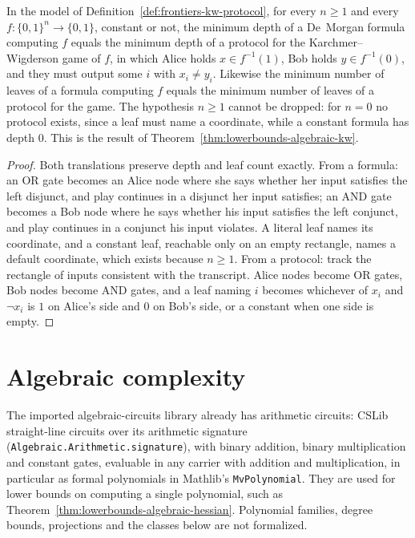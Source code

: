 \begin{theorem}
  \label{thm:frontiers-kw-general}
  \leanok
  In the model of Definition~\ref{def:frontiers-kw-protocol}, for every
  $n \ge 1$ and every $f : \{0,1\}^n \to \{0,1\}$, constant or not, the minimum
  depth of a De~Morgan formula computing $f$ equals the minimum depth of a
  protocol for the Karchmer--Wigderson game of $f$, in which Alice holds
  $x \in f^{-1}(1)$, Bob holds $y \in f^{-1}(0)$, and they must output some $i$
  with $x_i \neq y_i$. Likewise the minimum number of leaves of a formula
  computing $f$ equals the minimum number of leaves of a protocol for the game.
  The hypothesis $n \ge 1$ cannot be dropped: for $n = 0$ no protocol exists,
  since a leaf must name a coordinate, while a constant formula has depth $0$.
  This is the result of Theorem~\ref{thm:lowerbounds-algebraic-kw}.
\end{theorem}
\begin{proof}
  \leanok
  Both translations preserve depth and leaf count exactly. From a formula: an
  OR gate becomes an Alice node where she says whether her input satisfies the
  left disjunct, and play continues in a disjunct her input satisfies; an AND
  gate becomes a Bob node where he says whether his input satisfies the left
  conjunct, and play continues in a conjunct his input violates. A literal leaf
  names its coordinate, and a constant leaf, reachable only on an empty
  rectangle, names a default coordinate, which exists because $n \ge 1$. From a
  protocol: track the rectangle of inputs consistent with the transcript. Alice
  nodes become OR gates, Bob nodes become AND gates, and a leaf naming $i$
  becomes whichever of $x_i$ and $\lnot x_i$ is $1$ on Alice's side and $0$ on
  Bob's side, or a constant when one side is empty.
\end{proof}

\section{Algebraic complexity}

The imported algebraic-circuits library already has arithmetic circuits: CSLib
straight-line circuits over its arithmetic signature
(\texttt{Algebraic.Arithmetic.signature}), with binary addition, binary
multiplication and constant gates, evaluable in any carrier with addition and
multiplication, in particular as formal polynomials in Mathlib's
\texttt{MvPolynomial}. They are used for lower bounds on computing a single
polynomial, such as Theorem~\ref{thm:lowerbounds-algebraic-hessian}. Polynomial
families, degree bounds, projections and the classes below are not formalized.

